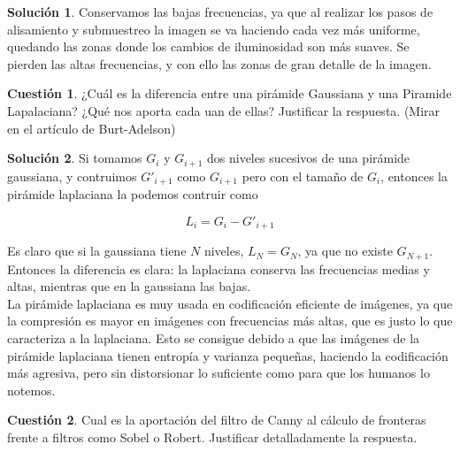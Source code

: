 \documentclass[a4paper, 11pt]{article}
\theoremstyle{definition}
\newtheorem{cuestion}{Cuestión}
\newtheorem*{solucion}{Solución}
\begin{document}
  \begin{solucion}
     	Conservamos las bajas frecuencias, ya que al realizar los pasos de alisamiento
      y submuestreo la imagen se va haciendo cada vez más uniforme, quedando
      las zonas donde los cambios de iluminosidad son más suaves. Se pierden
      las altas frecuencias, y con ello las zonas de gran detalle de la imagen.
  \end{solucion}
  \begin{cuestion}
     	¿Cuál es la diferencia entre una pirámide Gaussiana y una Piramide
      Lapalaciana? ¿Qué nos aporta cada uan de ellas? Justificar la respuesta.
      (Mirar en el artículo de Burt-Adelson)

  \end{cuestion}

  \begin{solucion}
     	Si tomamos $G_i$ y $G_{i+1}$ dos niveles sucesivos de una pirámide gaussiana,
      y contruimos $G'_{i+1}$ como $G_{i+1}$ pero con el tamaño de $G_i$, entonces
      la pirámide laplaciana la podemos contruir como

      $$L_i = G_i - G'_{i+1}$$

      Es claro que si la gaussiana tiene $N$ niveles, $L_N = G_N$, ya que no existe
      $G_{N+1}$. Entonces la diferencia es clara: la laplaciana conserva las
      frecuencias medias y altas, mientras que en la gaussiana las bajas. \\

      La pirámide laplaciana es muy usada en codificación eficiente de imágenes,
      ya que la compresión es mayor en imágenes con frecuencias más altas, que es
      justo lo que caracteriza a la laplaciana. Esto se consigue debido a que las
      imágenes de la pirámide laplaciana tienen entropía y varianza pequeñas,
      haciendo la codificación más agresiva, pero sin distorsionar lo suficiente
      como para que los humanos lo notemos.
  \end{solucion}

  \begin{cuestion}
     	Cual es la aportación del filtro de Canny al cálculo de fronteras
      frente a filtros como Sobel o Robert. Justificar detalladamente la
      respuesta.
  \end{cuestion}
\end{document}
